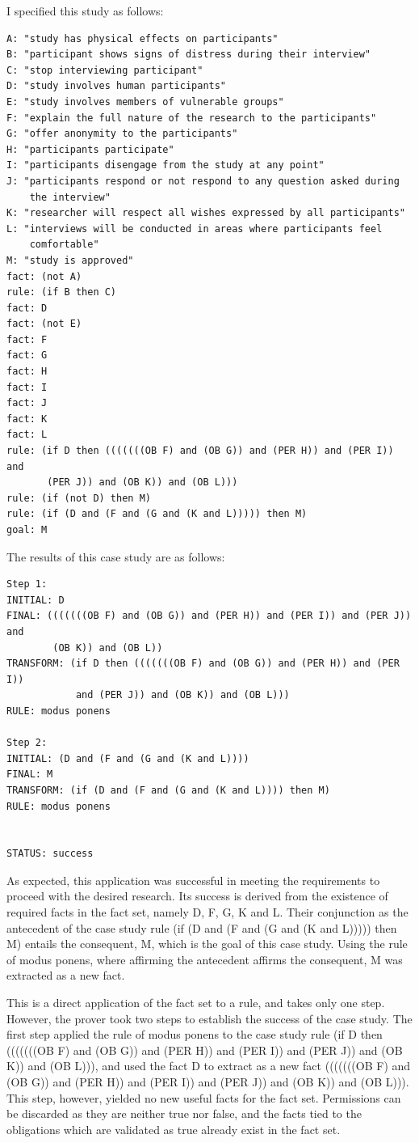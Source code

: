 \documentclass{l4proj}
\begin{document}
I specified this study as follows: 
\begin{verbatim}
A: "study has physical effects on participants"
B: "participant shows signs of distress during their interview"
C: "stop interviewing participant"
D: "study involves human participants"
E: "study involves members of vulnerable groups"
F: "explain the full nature of the research to the participants"
G: "offer anonymity to the participants"
H: "participants participate"
I: "participants disengage from the study at any point"
J: "participants respond or not respond to any question asked during 
    the interview"
K: "researcher will respect all wishes expressed by all participants"
L: "interviews will be conducted in areas where participants feel 
    comfortable"
M: "study is approved"
fact: (not A)
rule: (if B then C)
fact: D
fact: (not E)
fact: F
fact: G
fact: H
fact: I
fact: J 
fact: K
fact: L
rule: (if D then (((((((OB F) and (OB G)) and (PER H)) and (PER I)) and 
       (PER J)) and (OB K)) and (OB L)))
rule: (if (not D) then M)
rule: (if (D and (F and (G and (K and L))))) then M)
goal: M
\end{verbatim}

The results of this case study are as follows: 
\begin{verbatim}
Step 1: 
INITIAL: D
FINAL: (((((((OB F) and (OB G)) and (PER H)) and (PER I)) and (PER J)) and
        (OB K)) and (OB L))
TRANSFORM: (if D then (((((((OB F) and (OB G)) and (PER H)) and (PER I)) 
            and (PER J)) and (OB K)) and (OB L)))
RULE: modus ponens

Step 2: 
INITIAL: (D and (F and (G and (K and L))))
FINAL: M
TRANSFORM: (if (D and (F and (G and (K and L)))) then M)
RULE: modus ponens


STATUS: success
\end{verbatim}

As expected, this application was successful in meeting the requirements to proceed with the desired research. Its success is derived from the existence of required facts in the fact set, namely D, F, G, K and L. Their conjunction as the antecedent of the case study rule (if (D and (F and (G and (K and L))))) then M) entails the consequent, M, which is the goal of this case study. Using the rule of modus ponens, where affirming the antecedent affirms the consequent, M was extracted as a new fact. 

This is a direct application of the fact set to a rule, and takes only one step. However, the prover took two steps to establish the success of the case study. The first step applied the rule of modus ponens to the case study rule (if D then (((((((OB F) and (OB G)) and (PER H)) and (PER I)) and (PER J)) and (OB K)) and (OB L))), and used the fact D to extract as a new fact (((((((OB F) and (OB G)) and (PER H)) and (PER I)) and (PER J)) and (OB K)) and (OB L))). This step, however, yielded no new useful facts for the fact set. Permissions can be discarded as they are neither true nor false, and the facts tied to the obligations which are validated as true already exist in the fact set. 
\end{document}
